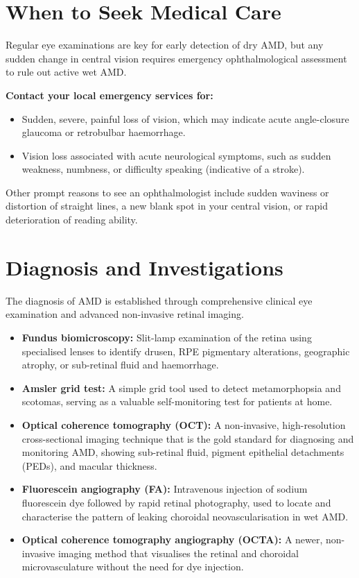 \section*{When to Seek Medical Care}
Regular eye examinations are key for early detection of dry AMD, but any sudden change in central vision requires emergency ophthalmological assessment to rule out active wet AMD.

\textbf{Contact your local emergency services for:}
\begin{itemize}
    \item Sudden, severe, painful loss of vision, which may indicate acute angle-closure glaucoma or retrobulbar haemorrhage.
    \item Vision loss associated with acute neurological symptoms, such as sudden weakness, numbness, or difficulty speaking (indicative of a stroke).
\end{itemize}
Other prompt reasons to see an ophthalmologist include sudden waviness or distortion of straight lines, a new blank spot in your central vision, or rapid deterioration of reading ability.

\section*{Diagnosis and Investigations}
The diagnosis of AMD is established through comprehensive clinical eye examination and advanced non-invasive retinal imaging.
\begin{itemize}
    \item \textbf{Fundus biomicroscopy:} Slit-lamp examination of the retina using specialised lenses to identify drusen, RPE pigmentary alterations, geographic atrophy, or sub-retinal fluid and haemorrhage.
    \item \textbf{Amsler grid test:} A simple grid tool used to detect metamorphopsia and scotomas, serving as a valuable self-monitoring test for patients at home.
    \item \textbf{Optical coherence tomography (OCT):} A non-invasive, high-resolution cross-sectional imaging technique that is the gold standard for diagnosing and monitoring AMD, showing sub-retinal fluid, pigment epithelial detachments (PEDs), and macular thickness.
    \item \textbf{Fluorescein angiography (FA):} Intravenous injection of sodium fluorescein dye followed by rapid retinal photography, used to locate and characterise the pattern of leaking choroidal neovascularisation in wet AMD.
    \item \textbf{Optical coherence tomography angiography (OCTA):} A newer, non-invasive imaging method that visualises the retinal and choroidal microvasculature without the need for dye injection.
\end{itemize}

